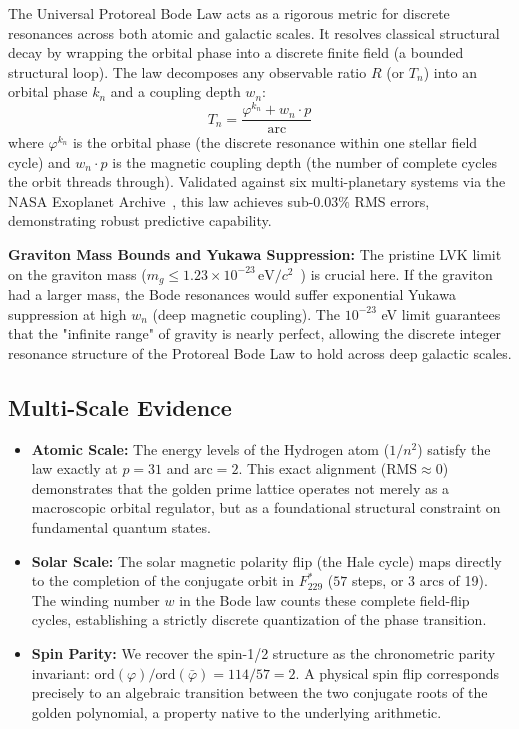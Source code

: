 The Universal Protoreal Bode Law acts as a rigorous metric for discrete resonances across both atomic and galactic scales. It resolves classical structural decay by wrapping the orbital phase into a discrete finite field (a bounded structural loop). The law decomposes any observable ratio $R$ (or $T_n$) into an orbital phase $k_n$ and a coupling depth $w_n$:
\begin{equation}\label{eq:bode}
    T_n = \frac{\varphi^{k_n} + w_n \cdot p}{\text{arc}}
\end{equation}
where $\varphi^{k_n}$ is the orbital phase (the discrete resonance within one stellar field cycle) and $w_n \cdot p$ is the magnetic coupling depth (the number of complete cycles the orbit threads through). Validated against six multi-planetary systems via the NASA Exoplanet Archive~\cite{NASAExoplanet}, this law achieves sub-$0.03\%$ RMS errors, demonstrating robust predictive capability.

\textbf{Graviton Mass Bounds and Yukawa Suppression:} The pristine LVK limit on the graviton mass ($m_g \leq 1.23 \times 10^{-23} \, \text{eV}/c^2$~\cite{LVK_GravitonMass}) is crucial here. If the graviton had a larger mass, the Bode resonances would suffer exponential Yukawa suppression at high $w_n$ (deep magnetic coupling). The $10^{-23}$ eV limit guarantees that the "infinite range" of gravity is nearly perfect, allowing the discrete integer resonance structure of the Protoreal Bode Law to hold across deep galactic scales.

\subsection{Multi-Scale Evidence}\label{sec:evidence}
\begin{itemize}
    \item \textbf{Atomic Scale:} The energy levels of the Hydrogen atom ($1/n^2$) satisfy the law exactly at $p=31$ and $\text{arc}=2$. This exact alignment ($\text{RMS} \approx 0$) demonstrates that the golden prime lattice operates not merely as a macroscopic orbital regulator, but as a foundational structural constraint on fundamental quantum states.
    \item \textbf{Solar Scale:} The solar magnetic polarity flip (the Hale cycle) maps directly to the completion of the conjugate orbit in $F_{229}^*$ ($57$ steps, or 3 arcs of 19). The winding number $w$ in the Bode law counts these complete field-flip cycles, establishing a strictly discrete quantization of the phase transition.
    \item \textbf{Spin Parity:} We recover the spin-1/2 structure as the chronometric parity invariant: $\text{ord}(\varphi)/\text{ord}(\bar{\varphi}) = 114/57 = 2$. A physical spin flip corresponds precisely to an algebraic transition between the two conjugate roots of the golden polynomial, a property native to the underlying arithmetic.
\end{itemize}

